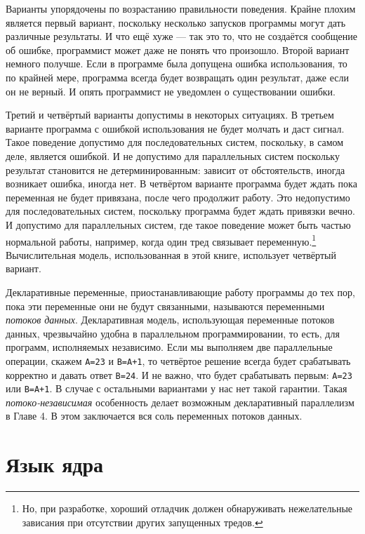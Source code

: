 Варианты упорядочены по возрастанию правильности поведения. Крайне плохим является первый вариант, поскольку несколько запусков программы могут дать различные результаты. И что ещё хуже --- так это то, что не создаётся сообщение об ошибке, программист может даже не понять что произошло. Второй вариант немного получше. Если в программе была допущена ошибка использования, то по крайней мере, программа всегда будет возвращать один результат, даже если он не верный. И опять программист не уведомлен о существовании ошибки.

Третий и четвёртый варианты допустимы в некоторых ситуациях. В третьем варианте программа с ошибкой использования не будет молчать и даст сигнал. Такое поведение допустимо для последовательных систем, поскольку, в самом деле, является ошибкой. И не допустимо для параллельных систем поскольку результат становится не детерминированным: зависит от обстоятельств, иногда возникает ошибка, иногда нет. В четвёртом варианте программа будет ждать пока переменная не будет привязана, после чего продолжит работу. Это недопустимо для последовательных систем, поскольку программа будет ждать привязки вечно. И допустимо для параллельных систем, где такое поведение может быть частью нормальной работы, например, когда один тред связывает переменную.\footnote{Но, при разработке, хороший отладчик должен обнаруживать нежелательные зависания при отсутствии других запущенных тредов.} Вычислительная модель, использованная в этой книге, использует четвёртый вариант.


Декларативные переменные, приостанавливающие работу программы до тех пор, пока эти переменные они не будут связанными, называются переменными \emph{потоков данных}. Декларативная модель, использующая переменные потоков данных, чрезвычайно удобна в параллельном программировании, то есть, для программ, исполняемых независимо. Если мы выполняем две параллельные операции, скажем \lstinline|A=23| и \lstinline|B=A+1|, то четвёртое решение всегда будет срабатывать корректно и давать ответ \lstinline|B=24|. И не важно, что будет срабатывать первым: \lstinline|A=23| или \lstinline|B=A+1|. В случае с остальными вариантами у нас нет такой гарантии. Такая \emph{потоко-независимая} особенность делает возможным декларативный параллелизм в Главе 4. В этом заключается вся соль переменных потоков данных.

\section{Язык ядра}\label{section:kernel_language}






